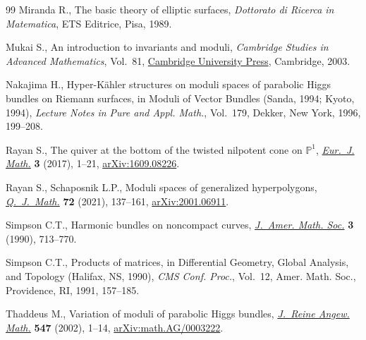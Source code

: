 \documentclass[10pt,a4paper]{amsart}
\numberwithin{equation}{section}
\begin{document}
\begin{thebibliography}{99}
Miranda R., The basic theory of elliptic surfaces, \textit{Dottorato di Ricerca in
 Matematica}, ETS Editrice, Pisa, 1989.

Mukai S., An introduction to invariants and moduli, \textit{Cambridge Studies
 in Advanced Mathematics}, Vol.~81, \href{https://doi.org/10.1017/CBO9781316257074}{Cambridge University Press}, Cambridge,
 2003.

Nakajima H., Hyper-{K}\"ahler structures on moduli spaces of parabolic {H}iggs
 bundles on {R}iemann surfaces, in Moduli of Vector Bundles ({S}anda, 1994;
 {K}yoto, 1994), \textit{Lecture Notes in Pure and Appl. Math.}, Vol.~179,
 Dekker, New York, 1996, 199--208.

Rayan S., The quiver at the bottom of the twisted nilpotent cone on
 {$\mathbb{P}^1$}, \href{https://doi.org/10.1007/s40879-016-0120-6}{\textit{Eur.~J. Math.}} \textbf{3} (2017), 1--21,
 \href{https://arxiv.org/abs/1609.08226}{arXiv:1609.08226}.

Rayan S., Schaposnik L.P., Moduli spaces of generalized hyperpolygons,
 \href{https://doi.org/10.1093/qmath/haaa036}{\textit{Q.~J.~Math.}} \textbf{72} (2021), 137--161, \href{https://arxiv.org/abs/2001.06911}{arXiv:2001.06911}.

Simpson C.T., Harmonic bundles on noncompact curves, \href{https://doi.org/10.2307/1990935}{\textit{J.~Amer. Math.
 Soc.}} \textbf{3} (1990), 713--770.

Simpson C.T., Products of matrices, in Differential Geometry, Global Analysis,
 and Topology ({H}alifax, {NS}, 1990), \textit{CMS Conf. Proc.}, Vol.~12,
 Amer. Math. Soc., Providence, RI, 1991, 157--185.

Thaddeus M., Variation of moduli of parabolic {H}iggs bundles, \href{https://doi.org/10.1515/crll.2002.051}{\textit{J.~Reine
 Angew. Math.}} \textbf{547} (2002), 1--14, \href{https://arxiv.org/abs/math.AG/0003222}{arXiv:math.AG/0003222}.

\end{thebibliography}
\end{document}
